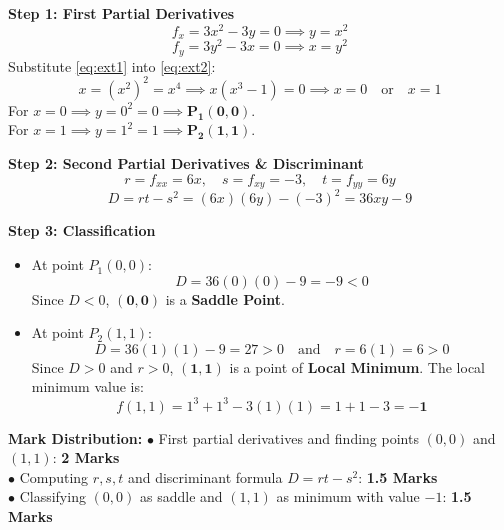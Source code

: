 \begin{solutionbox}
\textbf{Step 1: First Partial Derivatives}
\[
f_x = 3x^2 - 3y = 0 \implies y = x^2 \label{eq:ext1}
\]
\[
f_y = 3y^2 - 3x = 0 \implies x = y^2 \label{eq:ext2}
\]
Substitute \eqref{eq:ext1} into \eqref{eq:ext2}:
\[
x = (x^2)^2 = x^4 \implies x(x^3 - 1) = 0 \implies x = 0 \quad \text{or} \quad x = 1
\]
For $x = 0 \implies y = 0^2 = 0 \implies \mathbf{P_1(0,0)}$.\\
For $x = 1 \implies y = 1^2 = 1 \implies \mathbf{P_2(1,1)}$.

\textbf{Step 2: Second Partial Derivatives \& Discriminant}
\[
r = f_{xx} = 6x, \quad s = f_{xy} = -3, \quad t = f_{yy} = 6y
\]
\[
D = rt - s^2 = (6x)(6y) - (-3)^2 = 36xy - 9
\]

\textbf{Step 3: Classification}
\begin{itemize}[leftmargin=6mm]
    \item At point $P_1(0,0)$:
    \[
    D = 36(0)(0) - 9 = -9 < 0
    \]
    Since $D < 0$, $\mathbf{(0,0)}$ is a \textbf{Saddle Point}.
    \item At point $P_2(1,1)$:
    \[
    D = 36(1)(1) - 9 = 27 > 0 \quad \text{and} \quad r = 6(1) = 6 > 0
    \]
    Since $D > 0$ and $r > 0$, $\mathbf{(1,1)}$ is a point of \textbf{Local Minimum}.
    The local minimum value is:
    \[
    f(1,1) = 1^3 + 1^3 - 3(1)(1) = 1 + 1 - 3 = \mathbf{-1}
    \]
\end{itemize}

\begin{markingrubric}
\textbf{Mark Distribution:}
$\bullet$ First partial derivatives and finding points $(0,0)$ and $(1,1)$: \textbf{2 Marks}\\
$\bullet$ Computing $r, s, t$ and discriminant formula $D = rt - s^2$: \textbf{1.5 Marks}\\
$\bullet$ Classifying $(0,0)$ as saddle and $(1,1)$ as minimum with value $-1$: \textbf{1.5 Marks}
\end{markingrubric}
\end{solutionbox}

